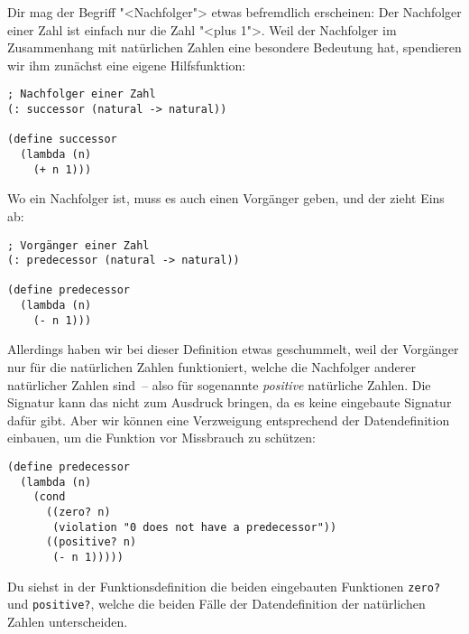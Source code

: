 Dir mag der Begriff "<Nachfolger"> etwas befremdlich erscheinen: Der
Nachfolger einer Zahl ist einfach nur die Zahl "<plus 1">.  Weil der
Nachfolger im Zusammenhang mit natürlichen Zahlen eine besondere
Bedeutung hat, spendieren wir ihm zunächst eine eigene Hilfsfunktion:
%
\begin{lstlisting}
; Nachfolger einer Zahl
(: successor (natural -> natural))

(define successor
  (lambda (n)
    (+ n 1)))
\end{lstlisting}
%
Wo ein Nachfolger ist, muss es auch einen Vorgänger geben, und der
zieht Eins ab:
%
\begin{lstlisting}
; Vorgänger einer Zahl
(: predecessor (natural -> natural))

(define predecessor
  (lambda (n)
    (- n 1)))
\end{lstlisting}
%
Allerdings haben wir bei dieser Definition etwas geschummelt, weil der
Vorgänger nur für die natürlichen Zahlen funktioniert, welche die
Nachfolger anderer natürlicher Zahlen sind~-- also für sogenannte
\textit{positive} natürliche Zahlen.
Die Signatur kann das nicht zum Ausdruck bringen, da es keine
eingebaute Signatur dafür gibt.  Aber wir können eine Verzweigung
entsprechend der Datendefinition einbauen, um die Funktion vor
Missbrauch zu schützen:
%
\begin{lstlisting}
(define predecessor
  (lambda (n)
    (cond
      ((zero? n)
       (violation "0 does not have a predecessor"))
      ((positive? n)
       (- n 1)))))
\end{lstlisting}
%
Du siehst in der Funktionsdefinition die beiden eingebauten Funktionen
\lstinline{zero?} und
\lstinline{positive?}, welche die
beiden Fälle der Datendefinition der natürlichen Zahlen unterscheiden.

